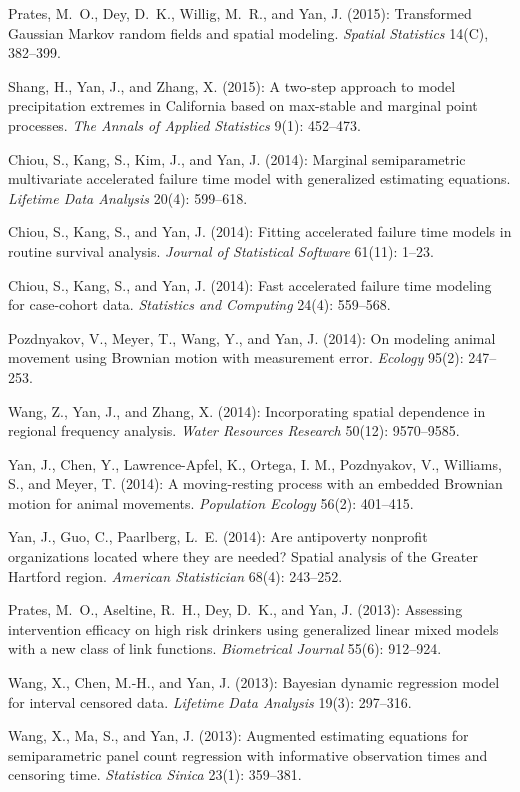 \documentclass[Statistics]{vita}
\begin{document}
\begin{vita}
\begin{Publications}
\begin{RefereedJournalArticles}
  \item *Prates, M.~O., Dey, D.~K., Willig, M.~R., and Yan, J. (2015): Transformed Gaussian Markov random fields and spatial modeling. {\em Spatial Statistics\/} 14(C), 382--399.
  \item *Shang, H., Yan, J., and Zhang, X. (2015): A two-step approach to model precipitation extremes in {C}alifornia based on max-stable and marginal point processes. {\em The Annals of Applied Statistics\/} 9(1): 452--473.
  \item *Chiou, S., Kang, S., Kim, J., and Yan, J. (2014): Marginal semiparametric multivariate accelerated failure time model with generalized estimating equations. {\em Lifetime Data Analysis\/} 20(4): 599--618.
  \item *Chiou, S., Kang, S., and Yan, J. (2014): Fitting accelerated failure time models in routine survival analysis. {\em Journal of Statistical Software\/} 61(11): 1--23.
  \item *Chiou, S., Kang, S., and Yan, J. (2014): Fast accelerated failure time modeling for case-cohort data. {\em Statistics and Computing\/} 24(4): 559--568.
  \item Pozdnyakov, V., Meyer, T., Wang, Y., and Yan, J. (2014): On modeling animal movement using Brownian motion with measurement error. {\em Ecology\/} 95(2): 247--253.
  \item *Wang, Z., Yan, J., and Zhang, X. (2014): Incorporating spatial dependence in regional frequency analysis. {\em Water Resources Research\/} 50(12): 9570--9585.
  \item Yan, J., Chen, Y., Lawrence-Apfel, K., Ortega, I. M., Pozdnyakov, V., Williams, S., and Meyer, T. (2014): A moving-resting process with an embedded Brownian motion for animal movements. {\em Population Ecology\/} 56(2): 401--415.
  \item Yan, J., Guo, C., Paarlberg, L.~E. (2014): Are antipoverty nonprofit organizations located where they are needed? Spatial analysis of the Greater Hartford region. {\em American Statistician\/} 68(4): 243--252.
  \item *Prates, M.~O., Aseltine, R.~H., Dey, D.~K., and Yan, J. (2013): Assessing intervention efficacy on high risk drinkers using generalized linear mixed models with a new class of link functions. {\em Biometrical Journal\/} 55(6): 912--924.
  \item *Wang, X., Chen, M.-H., and Yan, J. (2013): Bayesian dynamic regression model for interval censored data. {\em Lifetime Data Analysis\/} 19(3): 297--316.
  \item *Wang, X., Ma, S., and Yan, J. (2013): Augmented estimating equations for semiparametric panel count regression with informative observation times and censoring time. {\em Statistica Sinica\/} 23(1): 359--381.

\end{RefereedJournalArticles}
\end{Publications}
\end{vita}
\end{document}
